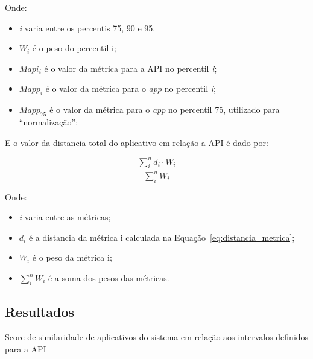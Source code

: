 Onde:
\begin{itemize}
\item \textit{i} varia entre os percentis 75, 90 e 95. 
\item $W_i$ é o peso do percentil i;
\item $Mapi_i$ é o valor da métrica para a API no percentil \textit{i};
\item $Mapp_i$ é o valor da métrica para o \textit{app} no percentil \textit{i};
\item $Mapp_{75}$ é o valor da métrica para o \textit{app} no percentil 75, utilizado para ``normalização'';
\end{itemize}

E o valor da distancia total do aplicativo em relação a API é dado por:

\begin{center}
\begin{equation} \label{eq:distancia_total}
\displaystyle \frac{\sum_{i}^{n} d_i\cdot W_i}{\sum_{i}^{n} W_i}
\end{equation}
\end{center}

Onde:
\begin{itemize}
\item \textit{i} varia entre as métricas;
\item $d_i$ é a distancia da métrica i calculada na Equação~\ref{eq:distancia_metrica};
\item $W_i$ é o peso da métrica i;
\item $\sum_{i}^{n} W_i$ é a soma dos pesos das métricas.
\end{itemize}

\subsection{Resultados}

\begin{table}[!htb]
\centering
{}

\caption{Score de similaridade de aplicativos do sistema em relação aos intervalos definidos para a API}
\label{tab:relative_distance}
\end{table}

